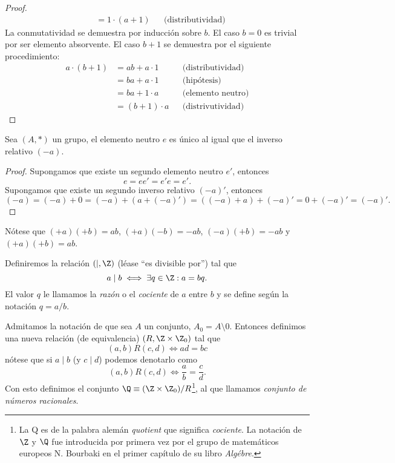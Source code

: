 \documentclass[11pt,oneside,a4paper]{book}
\begin{document}
\begin{proof}
$$\begin{aligned}
&=1\cdot(a+1) &&\text{(distributividad)}
\end{aligned}$$
La conmutatividad se demuestra por inducción sobre $b$. El caso $b=0$ es trivial por ser elemento absorvente. El caso $b+1$ se demuestra por el siguiente procedimiento:
$$\begin{aligned}
a\cdot(b+1)&=ab+a\cdot 1 &&\text{(distributividad)}\\
&=ba+a\cdot 1 &&\text{(hipótesis)}\\
&=ba+1\cdot a &&\text{(elemento neutro)}\\
&=(b+1)\cdot a &&\text{(distrivutividad)}
\end{aligned}$$
\end{proof}
\begin{thm}
Sea $(A,*)$ un grupo, el elemento neutro $e$ es único al igual que el inverso relativo $(-a)$. 
\end{thm}
\begin{proof}
Supongamos que existe un segundo elemento neutro $e'$, entonces
$$e=ee'=e'e=e'.$$
Supongamos que existe un segundo inverso relativo $(-a)'$, entonces
$$(-a)=(-a)+0=(-a)+(a+(-a)')=((-a)+a)+(-a)'=0+(-a)'=(-a)'.$$
\end{proof}
Nótese que $(+a)(+b)=ab$, $(+a)(-b)=-ab$, $(-a)(+b)=-ab$ y $(+a)(+b)=ab$.
\begin{mydef}[Divisibilidad]
Definiremos la relación $(|,\Z)$ (léase ``es divisible por'') tal que
$$a\mid b\iff\exists q\in\Z:a=bq.$$
El valor $q$ le llamamos la \textit{razón} o el \textit{cociente} de $a$ entre $b$ y se define según la notación $q=a/b$. 
\end{mydef}

Admitamos la notación de que sea $A$ un conjunto, $A_0=A\setminus 0$. Entonces definimos una nueva relación (de equivalencia) $(R,\Z\times\Z_0)$ tal que
$$(a,b)R(c,d)\iff ad=bc$$
nótese que si $a\mid b$ (y $c\mid d$) podemos denotarlo como
$$(a,b)R(c,d)\iff\frac ab=\frac cd.$$
Con esto definimos el conjunto $\Q\equiv(\Z\times\Z_0)/R$\footnote{La Q es de la palabra alemán \textit{quotient} que significa \textit{cociente}. La notación de $\Z$ y $\Q$ fue introducida por primera vez por el grupo de matemáticos europeos N. Bourbaki en el primer capítulo de su libro \textit{Algébre}.}, al que llamamos \textit{conjunto de números racionales}.
\end{document}
